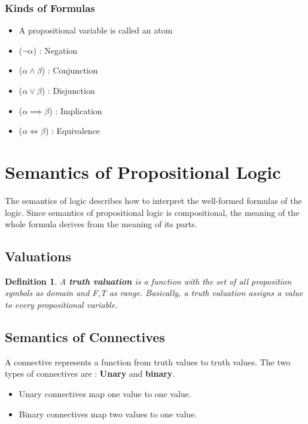 \documentclass{article}
\newtheorem{definition}[theorem]{Definition}
\begin{document}
\subsubsection{Kinds of Formulas}
\begin{itemize}
\item A propositional variable is called an atom 
\item (\(\neg \alpha\)) : Negation 
\item (\(\alpha \wedge \beta\)) : Conjunction
\item (\(\alpha \vee \beta\)) : Disjunction 
\item (\(\alpha \implies \beta\)) : Implication 
\item (\(\alpha \iff \beta\)) : Equivalence 
\end{itemize}

\section{Semantics of Propositional Logic}
The semantics of logic describes how to interpret the well-formed formulas of the logic.  Since semantics of propositional logic is compositional, the meaning of the whole formula derives from the meaning of its parts. 

\subsection{Valuations}

\begin{definition}
A \textbf{truth valuation} is a function with the set of all proposition symbols as domain and {F,T} as range. Basically, a truth valuation assigns a value to every propositional variable. 
\end{definition}

\subsection{Semantics of Connectives}
A connective represents a function from truth values to truth values. 
The two types of connectives are : \textbf{Unary} and \textbf{binary}.  

\begin{itemize}
\item Unary connectives map one value to one value. 
\item Binary connectives map two values to one value. 
\end{itemize}
\end{document}
